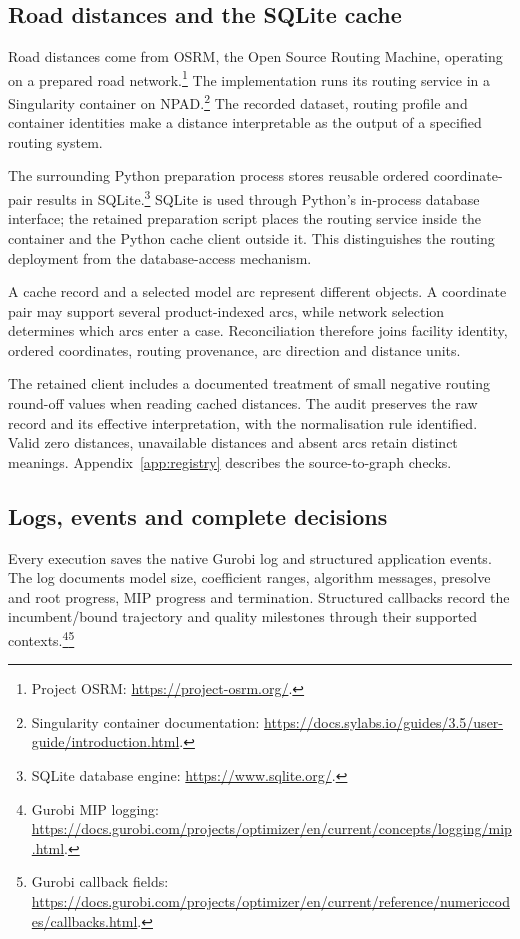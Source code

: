 \documentclass[11pt,a4paper]{article}
\newcommand{\technical}[2]{\footnote{#1: \url{#2}.}}
\begin{document}
\subsection{Road distances and the SQLite cache}

Road distances come from OSRM, the Open Source Routing Machine, operating on a prepared road network.\technical{Project OSRM}{https://project-osrm.org/} The implementation runs its routing service in a Singularity container on NPAD.\technical{Singularity container documentation}{https://docs.sylabs.io/guides/3.5/user-guide/introduction.html} The recorded dataset, routing profile and container identities make a distance interpretable as the output of a specified routing system.

The surrounding Python preparation process stores reusable ordered coordinate-pair results in SQLite.\technical{SQLite database engine}{https://www.sqlite.org/} SQLite is used through Python's in-process database interface; the retained preparation script places the routing service inside the container and the Python cache client outside it. This distinguishes the routing deployment from the database-access mechanism.

A cache record and a selected model arc represent different objects. A coordinate pair may support several product-indexed arcs, while network selection determines which arcs enter a case. Reconciliation therefore joins facility identity, ordered coordinates, routing provenance, arc direction and distance units.

The retained client includes a documented treatment of small negative routing round-off values when reading cached distances. The audit preserves the raw record and its effective interpretation, with the normalisation rule identified. Valid zero distances, unavailable distances and absent arcs retain distinct meanings. Appendix~\ref{app:registry} describes the source-to-graph checks.

\subsection{Logs, events and complete decisions}

Every execution saves the native Gurobi log and structured application events. The log documents model size, coefficient ranges, algorithm messages, presolve and root progress, MIP progress and termination. Structured callbacks record the incumbent/bound trajectory and quality milestones through their supported contexts.\technical{Gurobi MIP logging}{https://docs.gurobi.com/projects/optimizer/en/current/concepts/logging/mip.html}\technical{Gurobi callback fields}{https://docs.gurobi.com/projects/optimizer/en/current/reference/numericcodes/callbacks.html}
\end{document}
